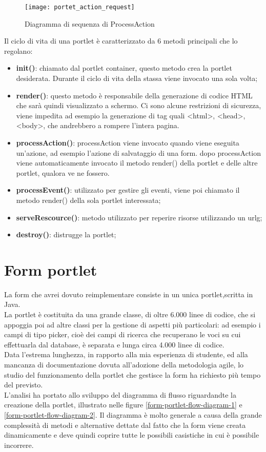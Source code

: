 \begin{figure}[h]
	\centering
	\texttt{[image: portet\_action\_request]}
	\caption{Diagramma di sequenza di ProcessAction}
	\label{process-action}
\end{figure}

Il ciclo di vita di una \gls{portlet} è caratterizzato da 6 metodi principali che lo regolano:
\begin{itemize}
	\item \textbf{init()}: chiamato dal portlet container, questo metodo crea la \gls{portlet} desiderata. Durante il ciclo di vita della stassa viene invocato una sola volta;
	\item \textbf{render()}: questo metodo è responsabile della generazione di codice HTML che sarà quindi visualizzato a schermo. Ci sono alcune restrizioni di sicurezza, viene impedita ad esempio la generazione di tag quali <html>, <head>, <body>, che andrebbero a rompere l'intera pagina.
	\item \textbf{processAction()}: processAction viene invocato quando viene eseguita un'azione, ad esempio l'azione di salvataggio di una form. dopo processAction viene automaticamente invocato il metodo render() della portlet e delle altre \gls{portlet}, qualora ve ne fossero.
	\item \textbf{processEvent()}: utilizzato per gestire gli eventi, viene poi chiamato il metodo render() della sola \gls{portlet} interessata;
	\item \textbf{serveRescource()}: metodo utilizzato per reperire risorse utilizzando un \gls{urlg};
	\item \textbf{destroy()}: distrugge la \gls{portlet};
\end{itemize}	

\section{Form portlet}
La form che avrei dovuto reimplementare consiste in un unica portlet,scritta in Java. \\
La portlet è costituita da una grande classe, di oltre 6.000 linee di codice, che si appoggia poi ad altre classi per la gestione di aspetti più particolari: ad esempio i campi di tipo picker, cioè dei campi di ricerca che recuperano le voci su cui effettuarla dal database, è separata e lunga circa 4.000 linee di codice.\\
Data l'estrema lunghezza, in rapporto alla mia esperienza di studente, ed alla mancanza di documentazione dovuta all'adozione della metodologia agile, lo studio del funzionamento della portlet che gestisce la form ha richiesto più tempo del previsto. \\ 
L'analisi ha portato allo sviluppo del diagramma di flusso riguardandte la creazione della \gls{portlet}, illustrato nelle figure \ref{form-portlet-flow-diagram-1} e \ref{form-portlet-flow-diagram-2}. Il diagramma è molto generale a causa della grande complessità di metodi e alternative dettate dal fatto che la form viene creata dinamicamente e deve quindi coprire tutte le possibili casistiche in cui è possibile incorrere.\\

